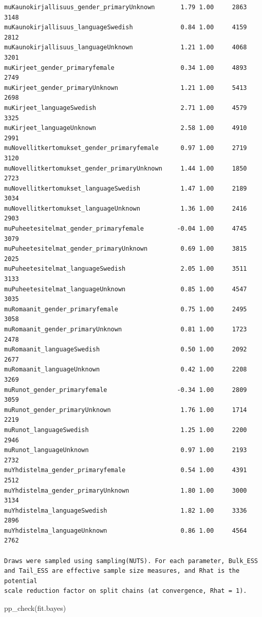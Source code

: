 \documentclass[
  letterpaper,
  DIV=11,
  numbers=noendperiod]{scrartcl}
\newenvironment{Shaded}{\begin{snugshade}}{\end{snugshade}}
\newcommand{\FunctionTok}[1]{\textcolor[rgb]{0.28,0.35,0.67}{#1}}
\newcommand{\NormalTok}[1]{\textcolor[rgb]{0.00,0.23,0.31}{#1}}
\begin{document}
\begin{verbatim}
muKaunokirjallisuus_gender_primaryUnknown       1.79 1.00     2863     3148
muKaunokirjallisuus_languageSwedish             0.84 1.00     4159     2812
muKaunokirjallisuus_languageUnknown             1.21 1.00     4068     3201
muKirjeet_gender_primaryfemale                  0.34 1.00     4893     2749
muKirjeet_gender_primaryUnknown                 1.21 1.00     5413     2698
muKirjeet_languageSwedish                       2.71 1.00     4579     3325
muKirjeet_languageUnknown                       2.58 1.00     4910     2991
muNovellitkertomukset_gender_primaryfemale      0.97 1.00     2719     3120
muNovellitkertomukset_gender_primaryUnknown     1.44 1.00     1850     2723
muNovellitkertomukset_languageSwedish           1.47 1.00     2189     3034
muNovellitkertomukset_languageUnknown           1.36 1.00     2416     2903
muPuheetesitelmat_gender_primaryfemale         -0.04 1.00     4745     3079
muPuheetesitelmat_gender_primaryUnknown         0.69 1.00     3815     2025
muPuheetesitelmat_languageSwedish               2.05 1.00     3511     3133
muPuheetesitelmat_languageUnknown               0.85 1.00     4547     3035
muRomaanit_gender_primaryfemale                 0.75 1.00     2495     3058
muRomaanit_gender_primaryUnknown                0.81 1.00     1723     2478
muRomaanit_languageSwedish                      0.50 1.00     2092     2677
muRomaanit_languageUnknown                      0.42 1.00     2208     3269
muRunot_gender_primaryfemale                   -0.34 1.00     2809     3059
muRunot_gender_primaryUnknown                   1.76 1.00     1714     2219
muRunot_languageSwedish                         1.25 1.00     2200     2946
muRunot_languageUnknown                         0.97 1.00     2193     2732
muYhdistelma_gender_primaryfemale               0.54 1.00     4391     2512
muYhdistelma_gender_primaryUnknown              1.80 1.00     3000     3134
muYhdistelma_languageSwedish                    1.82 1.00     3336     2896
muYhdistelma_languageUnknown                    0.86 1.00     4564     2762

Draws were sampled using sampling(NUTS). For each parameter, Bulk_ESS
and Tail_ESS are effective sample size measures, and Rhat is the potential
scale reduction factor on split chains (at convergence, Rhat = 1).
\end{verbatim}

\begin{Shaded}
\begin{Highlighting}[]
\FunctionTok{pp\_check}\NormalTok{(fit.bayes)         }
\end{Highlighting}
\end{Shaded}
\end{document}
